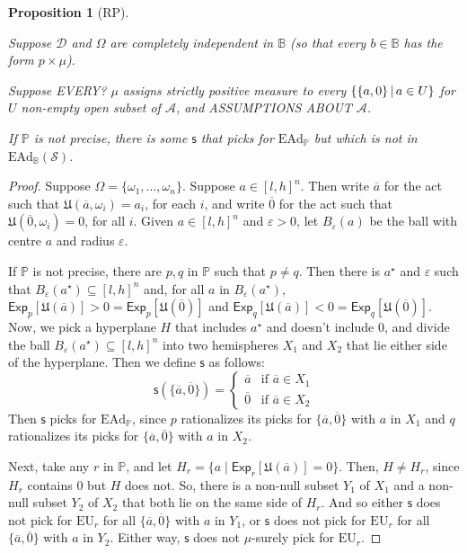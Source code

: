 \documentclass[a4paper]{article}
\newtheorem{proposition}[theorem]{Proposition}
\newcommand\A{\mathcal{A}}
\renewcommand\P{\mathbb{P}} %
\newcommand\Exp{\mathsf{Exp}}
\newcommand\EU{\mathrm{EU}}
\newcommand\EAd{\mathrm{EAd}}
\newcommand\U{\mathfrak{U}} %
\newcommand{\D}{\mathcal{D}}
\renewcommand\S{\mathcal{S}}
\newcommand\s{\mathsf{s}}
\newcommand{\IB}{\mathbb{B}}
\newcommand{\IP}{\P}
\newcommand{\Strategies}{\S}
\newcommand\SetDelimiter[1][]{
	\nonscript\,#1\vert \allowbreak \nonscript\,\mathopen{}}
\providecommand\given{\SetDelimiter}
\newenvironment{CCM rewritten}
{\begingroup\color{blue}} %
{\endgroup}              %
\begin{document}
\begin{proposition}[RP]\label{thm:ead-existsimpermissible[indep]:RP-1}
	
	Suppose $\D$ and $\Omega$ are completely independent in $\IB$ (so that every $b\in\IB$ has the form $p\times\mu$).
	
	Suppose EVERY? $\mu$ assigns strictly positive measure to every $\{\{a,0\}\given a\in U\}$ for $U$ non-empty open subset of $\A$, and ASSUMPTIONS ABOUT $\A$. 
	
	If $\IP$ is not precise, there is some $\s$ that picks for $\EAd_\IP$ but which is not in $\EAd_\IB(\Strategies)$.
\end{proposition}
\begin{proof}
	Suppose $\Omega = \{\omega_1, \ldots, \omega_n\}$. Suppose $a \in [l, h]^n$. Then write $\overline{a}$ for the act such that $\U(\overline{a}, \omega_i) = a_i$, for each $i$, and write $\overline{0}$ for the act such that $\U(\overline{0}, \omega_i) = 0$, for all $i$. Given $a \in [l, h]^n$ and $\varepsilon > 0$, let $B_\varepsilon(a)$ be the ball with centre $a$ and radius $\varepsilon$.
	
	If $\IP$ is not precise, there are $p, q$ in $\IP$ such that $p \neq q$. Then there is $a^\star$ and $\varepsilon$ such that $B_\varepsilon(a^\star) \subseteq [l, h]^n$ and, for all $a$ in $B_\varepsilon(a^\star)$, $\Exp_p[\U(\overline{a})] > 0 = \Exp_p[\U(\overline{0})]$ and $\Exp_q[\U(\overline{a})] < 0 = \Exp_q[\U(\overline{0})]$. Now, we pick a hyperplane $H$ that includes $a^\star$ and doesn't include $0$, and divide the ball $B_\varepsilon(a^\star) \subseteq [l, h]^n$ into two hemispheres $X_1$ and $X_2$ that lie either side of the hyperplane. Then we define $\s$ as follows:
	$$
	\s(\{\overline{a}, \overline{0}\}) = \left \{ 
	\begin{array}{rl}
		\overline{a} & \text{if } \overline{a} \in X_1 \\
		\overline{0} & \text{if } \overline{a} \in X_2 
	\end{array}
	\right.
	$$
	Then $\s$ picks for $\EAd_\IP$, since $p$ rationalizes its picks for $\{\overline{a}, \overline{0}\}$ with $a$ in $X_1$ and $q$ rationalizes its picks for $\{\overline{a}, \overline{0}\}$ with $a$ in $X_2$.
	
	Next, take any $r$ in $\IP$, and let $H_r = \{a \mid \Exp_r[\U(\overline{a})] = 0\}$. Then, $H \neq H_r$, since $H_r$ contains $0$ but $H$ does not. So, there is a non-null subset $Y_1$ of $X_1$ and a non-null subset $Y_2$ of $X_2$ that both lie on the same side of $H_r$. And so either $\s$ does not pick for $\EU_r$ for all $\{\overline{a}, \overline{0}\}$ with $a$ in $Y_1$, or $\s$ does not pick for $\EU_r$ for all $\{\overline{a}, \overline{0}\}$ with $a$ in $Y_2$. Either way, $\s$ does not $\mu$-surely pick for $\EU_r$. 
	

\end{proof}
\end{document}
